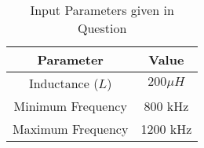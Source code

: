\documentclass[12pt]{article}
\begin{document}
\begin{table}[h]
  \centering
  \caption{Input Parameters given in Question}
  \label{tab:parameters}
  \begin{tabular}{|c|c|}
    \hline
    \textbf{Parameter} & \textbf{Value} \\
    \hline
    Inductance (\(L\)) & \(200\mu H\) \\
    Minimum Frequency & 800 kHz \\
    Maximum Frequency & 1200 kHz \\
    \hline
  \end{tabular}
\end{table}
\end{document}
